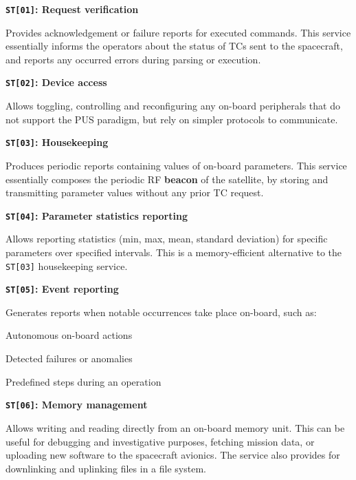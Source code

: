 \documentclass[a4paper,nobib]{tufte-book}
\begin{document}
\begin{compactitem}
	\item \textbf{\texttt{ST[01]}: Request verification}
	
	Provides acknowledgement or failure reports for executed commands. This service essentially informs the operators about the status of \acp{TC} sent to the spacecraft, and reports any occurred errors during parsing or execution.
	
	\item \textbf{\texttt{ST[02]}: Device access}
	
	Allows toggling, controlling and reconfiguring any on-board peripherals that do not support the \ac{PUS} paradigm, but rely on simpler protocols to communicate.
	
	\item \textbf{\texttt{ST[03]}: Housekeeping}
	
	Produces periodic reports containing values of on-board parameters. This service essentially composes the periodic \acs{RF} \textbf{beacon} of the satellite, by storing and transmitting parameter values without any prior \acs{TC} request.
	
	\item \textbf{\texttt{ST[04]}: Parameter statistics reporting}
	
	Allows reporting statistics (min, max, mean, standard deviation) for specific parameters over specified intervals. This is a memory-efficient alternative to the \texttt{ST[03]} housekeeping service.
	
	\item \textbf{\texttt{ST[05]}: Event reporting}
	
	Generates reports when notable occurrences take place on-board, such as:
	\begin{compactitem}
		\item Autonomous on-board actions
		\item Detected failures or anomalies
		\item Predefined steps during an operation
	\end{compactitem}
	
	\item \textbf{\texttt{ST[06]}: Memory management}
	
	Allows writing and reading directly from an on-board memory unit. This can be useful for debugging and investigative purposes, fetching mission data, or uploading new software to the spacecraft avionics. The service also provides for downlinking and uplinking files in a file system.
	

\end{compactitem}
\end{document}
